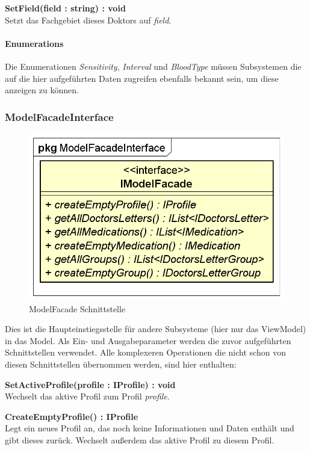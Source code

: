 \documentclass[a4paper]{scrreprt}
\begin{document}
\textbf{SetField(field : string) : void}\\
Setzt das Fachgebiet dieses Doktors auf \textit{field}.

\paragraph{Enumerations}
Die Enumerationen \textit{Sensitivity}, \textit{Interval} und \textit{BloodType} müssen Subsystemen die auf die hier aufgeführten Daten zugreifen ebenfalls bekannt sein, um diese anzeigen zu können.

\subsubsection{ModelFacadeInterface}
\begin{figure}[H]
\centering
\includegraphics[width=0.75\textheight]{graphics/Klassendiagramme/Model/ModelFacadeInterface.png}
\caption{ModelFacade Schnittstelle}
\end{figure}
Dies ist die Haupteinstiegsstelle für andere Subsysteme (hier nur das ViewModel) in das Model. Als Ein- und Ausgabeparameter werden die zuvor aufgeführten Schnittstellen verwendet. Alle komplexeren Operationen die nicht schon von diesen Schnittstellen übernommen werden, sind hier enthalten:

\textbf{SetActiveProfile(profile : IProfile) : void}\\
Wechselt das aktive Profil zum Profil \textit{profile}.

\textbf{CreateEmptyProfile() : IProfile}\\
Legt ein neues Profil an, das noch keine Informationen und Daten enthält und gibt dieses zurück. Wechselt außerdem das aktive Profil zu diesem Profil.
\end{document}
